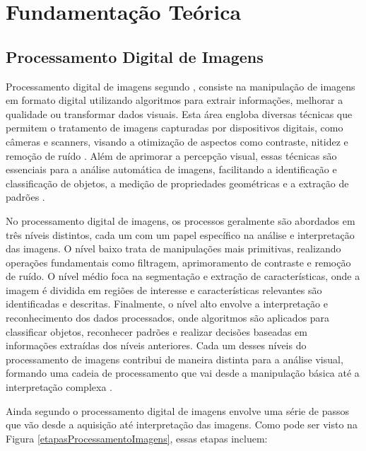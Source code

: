 



\chapter{Fundamentação Teórica}

\section{Processamento Digital de Imagens}

Processamento digital de imagens segundo , consiste na manipulação de imagens em formato digital utilizando algoritmos para extrair informações, melhorar a qualidade ou transformar dados visuais. Esta área engloba diversas técnicas que permitem o tratamento de imagens capturadas por dispositivos digitais, como câmeras e scanners, visando a otimização de aspectos como contraste, nitidez e remoção de ruído \cite{gonzalez2010processamento}. Além de aprimorar a percepção visual, essas técnicas são essenciais para a análise automática de imagens, facilitando a identificação e classificação de objetos, a medição de propriedades geométricas e a extração de padrões \cite{russ2006image}.

No processamento digital de imagens, os processos geralmente são abordados em três níveis distintos, cada um com um papel específico na análise e interpretação das imagens. O nível baixo trata de manipulações mais primitivas, realizando operações fundamentais como filtragem, aprimoramento de contraste e remoção de ruído. O nível médio foca na segmentação e extração de características, onde a imagem é dividida em regiões de interesse e características relevantes são identificadas e descritas. Finalmente, o nível alto envolve a interpretação e reconhecimento dos dados processados, onde algoritmos são aplicados para classificar objetos, reconhecer padrões e realizar decisões baseadas em informações extraídas dos níveis anteriores. Cada um desses níveis do processamento de imagens contribui de maneira distinta para a análise visual, formando uma cadeia de processamento que vai desde a manipulação básica até a interpretação complexa \cite{gonzalez2010processamento}. 

Ainda segundo  o processamento digital de imagens envolve uma série de passos que vão desde a aquisição até interpretação das imagens. Como pode ser visto na Figura \ref{etapasProcessamentoImagens}, essas etapas incluem:


